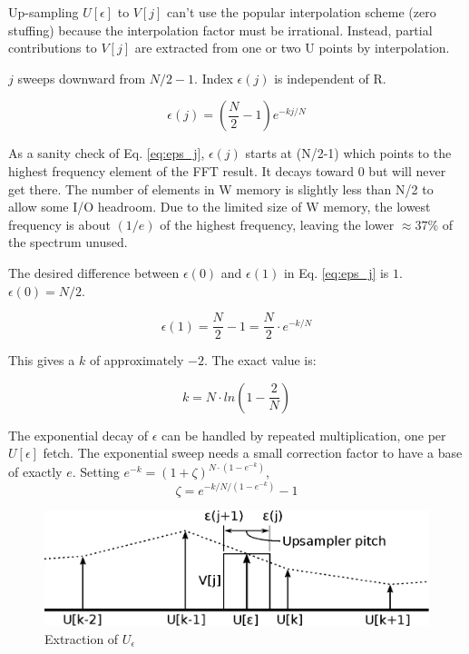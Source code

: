 Up-sampling $U[\epsilon]$ to $V[j]$ can't use the popular interpolation scheme
(zero stuffing) because the interpolation factor must be irrational. Instead,
partial contributions to $V[j]$ are extracted from one or two U points by
interpolation.

$j$ sweeps downward from $N/2-1$. Index $\epsilon(j)$ is independent of R.

\begin{equation}  \label{eq:eps_j}
\epsilon(j) = \left(\frac{N}{2}-1\right) e^{-kj/N}
\end{equation}

As a sanity check of Eq. \ref{eq:eps_j}, $\epsilon(j)$ starts at (N/2-1) which
points to the highest frequency element of the FFT result.
It decays toward 0 but will never get there.
The number of elements in W memory is slightly less than N/2 to allow some I/O
headroom. Due to the limited size of W memory,
the lowest frequency is about $(1/e)$ of the highest frequency,
leaving the lower $\approx37$\% of the spectrum unused.

The desired difference between $\epsilon(0)$ and $\epsilon(1)$ in 
Eq. \ref{eq:eps_j} is $1$. $\epsilon(0) = N/2$.

\begin{equation}
\epsilon(1) = \frac{N}{2} - 1 = \frac{N}{2} \cdot e^{-k/N}
\end{equation}

This gives a $k$ of approximately $-2$. The exact value is:

\begin{equation}
k = N \cdot ln \left( 1 - \frac{2}{N} \right)
\end{equation}

The exponential decay of $\epsilon$ can be handled by repeated multiplication,
one per $U[\epsilon]$ fetch.
The exponential sweep needs a small correction factor to have a base of exactly
$e$.
Setting $e^{-k} = (1 + \zeta)^{N \cdot (1 - e^{-k})}$,
\begin{equation}
\zeta = e^{-k/N/(1-e^{-k})} - 1
\end{equation}

\begin{figure}
	\centering
	\includegraphics[width=0.95\linewidth]{../source/uint_e}
	\caption[U interpolation]{Extraction of $U_\epsilon$}
	\label{fig:uint}
\end{figure}

